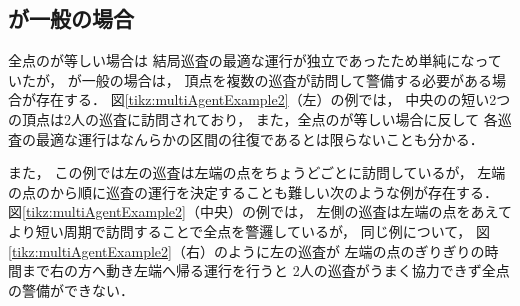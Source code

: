 
\subsection{{\idletime}が一般の場合}
\label{subsec:LineDifferentTimelimit}

全点の{\idletime}が等しい場合は
結局巡査の最適な運行が独立であったため単純になっていたが，
{\idletime}が一般の場合は，
頂点を複数の巡査が訪問して警備する必要がある場合が存在する．
%
図\ref{tikz:multiAgentExample2}（左）の例では，
中央の{\idletime}の短い2つの頂点は2人の巡査に訪問されており，
また，全点の{\idletime}が等しい場合に反して
各巡査の最適な運行はなんらかの区間の往復であるとは限らないことも分かる．


また，
この例では左の巡査は左端の点を{\idletime}ちょうどごとに訪問しているが，
左端の点の{\idletime}から順に巡査の運行を決定することも難しい次のような例が存在する．
図\ref{tikz:multiAgentExample2}（中央）の例では，
左側の巡査は左端の点をあえてより短い周期で訪問することで全点を警邏しているが，
同じ例について，
図\ref{tikz:multiAgentExample2}（右）のように左の巡査が
左端の点の{\idletime}ぎりぎりの時間まで右の方へ動き左端へ帰る運行を行うと
2人の巡査がうまく協力できず全点の警備ができない．

